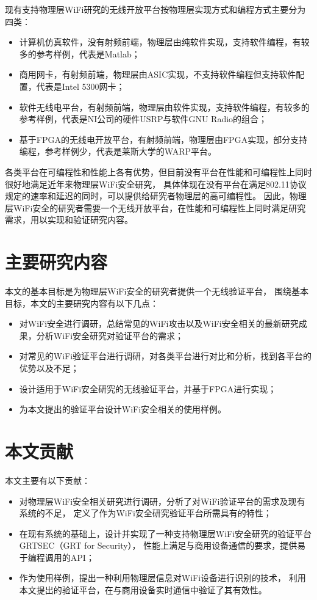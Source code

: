 		现有支持物理层WiFi研究的无线开放平台按物理层实现方式和编程方式主要分为四类：
		\begin{itemize}
			\item 计算机仿真软件，没有射频前端，物理层由纯软件实现，支持软件编程，有较多的参考样例，代表是Matlab；
			\item 商用网卡，有射频前端，物理层由ASIC实现，不支持软件编程但支持软件配置，代表是Intel 5300网卡；
			\item 软件无线电平台，有射频前端，物理层由软件实现，支持软件编程，有较多的参考样例，代表是NI公司的硬件USRP与软件GNU Radio的组合；
			\item 基于FPGA的无线电开放平台，有射频前端，物理层由FPGA实现，部分支持编程，参考样例少，代表是莱斯大学的WARP平台。
		\end{itemize}

		各类平台在可编程性和性能上各有优势，但目前没有平台在性能和可编程性上同时很好地满足近年来物理层WiFi安全研究，
		具体体现在没有平台在满足802.11协议规定的速率和延迟的同时，可以提供给研究者物理层的高可编程性。
		因此，物理层WiFi安全的研究者需要一个无线开放平台，在性能和可编程性上同时满足研究需求，用以实现和验证研究内容。

	\section{主要研究内容}
		本文的基本目标是为物理层WiFi安全的研究者提供一个无线验证平台，
		围绕基本目标，本文的主要研究内容有以下几点：
		\begin{itemize}
			\item 对WiFi安全进行调研，总结常见的WiFi攻击以及WiFi安全相关的最新研究成果，分析WiFi安全研究对验证平台的需求；
			\item 对常见的WiFi验证平台进行调研，对各类平台进行对比和分析，找到各平台的优势以及不足；
			\item 设计适用于WiFi安全研究的无线验证平台，并基于FPGA进行实现；
			\item 为本文提出的验证平台设计WiFi安全相关的使用样例。
		\end{itemize}

	\section{本文贡献}
		本文主要有以下贡献：
		\begin{itemize}
			\item 对物理层WiFi安全相关研究进行调研，分析了对WiFi验证平台的需求及现有系统的不足，
			定义了作为WiFi安全研究验证平台所需具有的特性；
			\item 在现有系统的基础上，设计并实现了一种支持物理层WiFi安全研究的验证平台GRTSEC（GRT for Security），
			性能上满足与商用设备通信的要求，提供易于编程调用的API；
			\item 作为使用样例，提出一种利用物理层信息对WiFi设备进行识别的技术，
			利用本文提出的验证平台，在与商用设备实时通信中验证了其有效性。
		\end{itemize}

